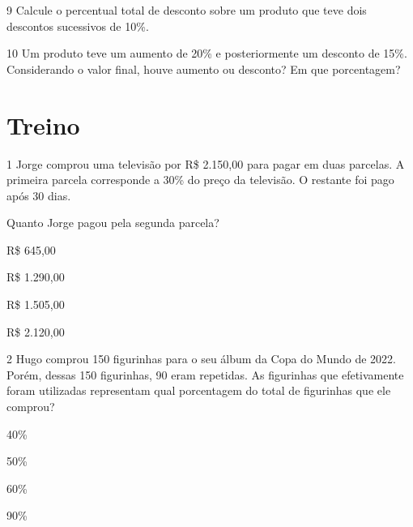 \begin{emptybox}
\end{emptybox}

\pagebreak
\num{9} Calcule o percentual total de desconto sobre um produto que teve
dois descontos sucessivos de 10\%.

\begin{emptybox}
\vspace{6.5cm}
\end{emptybox}

\num{10} Um produto teve um aumento de 20\% e posteriormente um desconto
de 15\%. Considerando o valor final, houve aumento ou desconto? Em que 
porcentagem?

\begin{emptybox}
\vspace{6.5cm}
\end{emptybox}

\pagebreak
\section*{Treino}

\num{1} Jorge comprou uma televisão por R\$ 2.150,00 para pagar em duas
parcelas. A primeira parcela corresponde a 30\% do preço da
televisão. O restante foi pago após 30 dias.

Quanto Jorge pagou pela segunda parcela?

\begin{escolha}
\item R\$ 645,00
\item R\$ 1.290,00
\item R\$ 1.505,00
\item R\$ 2.120,00
\end{escolha}


\num{2} Hugo comprou 150 figurinhas para o seu álbum da Copa do Mundo de
2022. Porém, dessas 150 figurinhas, 90 eram repetidas. As figurinhas que
efetivamente foram utilizadas representam qual porcentagem do total de
figurinhas que ele comprou?

\begin{escolha}
\item 40\%
\item 50\%
\item 60\%
\item 90\%
\end{escolha}


